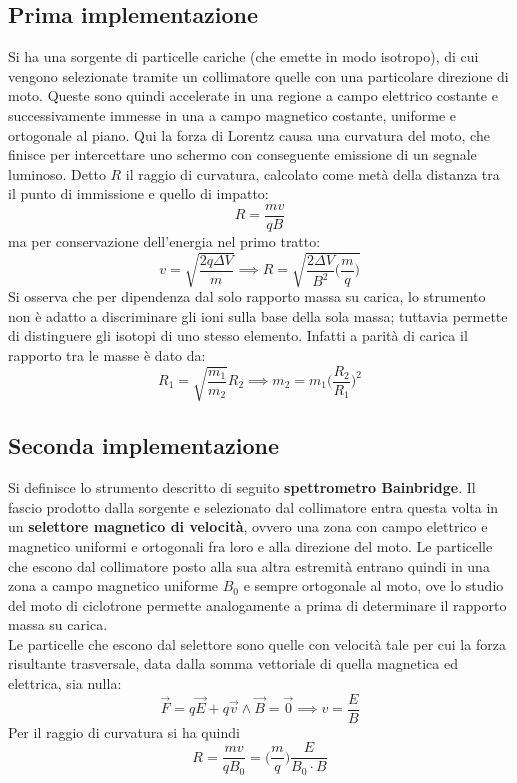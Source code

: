 \subsection{Prima implementazione}
Si ha una sorgente di particelle cariche (che emette in modo isotropo), di cui vengono selezionate tramite un collimatore quelle con una particolare direzione di moto. Queste sono quindi accelerate in una regione a campo elettrico costante e successivamente immesse in una a campo magnetico costante, uniforme e ortogonale al piano. Qui la forza di Lorentz causa una curvatura del moto, che finisce per intercettare uno schermo con conseguente emissione di un segnale luminoso. Detto $R$ il raggio di curvatura, calcolato come metà della distanza tra il punto di immissione e quello di impatto:
\[R = \frac{mv}{qB}\]
ma per conservazione dell'energia nel primo tratto:
\[v = \sqrt{\frac{2 q \Delta V}{m}} \implies R = \sqrt{\frac{2 \Delta V }{B^2} \big(\frac{m}{q}\big)}\]
Si osserva che per dipendenza dal solo rapporto massa su carica, lo strumento non è adatto a discriminare gli ioni sulla base della sola massa; tuttavia permette di distinguere gli isotopi di uno stesso elemento. Infatti a parità di carica il rapporto tra le masse è dato da:
\[R_1 = \sqrt{\frac{m_1}{m_2}} R_2 \implies m_2 = m_1 \big(\frac{R_2}{R_1}\big)^2\]

\subsection{Seconda implementazione}
Si definisce lo strumento descritto di seguito \textbf{spettrometro Bainbridge}. Il fascio prodotto dalla sorgente e selezionato dal collimatore entra questa volta in un \textbf{selettore magnetico di velocità}, ovvero una zona con campo elettrico e magnetico uniformi e ortogonali fra loro e alla direzione del moto. Le particelle che escono dal collimatore posto alla sua altra estremità entrano quindi in una zona a campo magnetico uniforme $B_0$ e sempre ortogonale al moto, ove lo studio del moto di ciclotrone permette analogamente a prima di determinare il rapporto massa su carica.
\\Le particelle che escono dal selettore sono quelle con velocità tale per cui la forza risultante trasversale, data dalla somma vettoriale di quella magnetica ed elettrica, sia nulla:
\[\vec{F} = q \vec{E} + q \vec{v} \wedge \vec{B} = \vec{0} \implies v = \frac{E}{B}\]
Per il raggio di curvatura si ha quindi
\[R = \frac{mv}{q B_0} = \big(\frac{m}{q}\big) \frac{E}{B_0 \cdot B}\]

